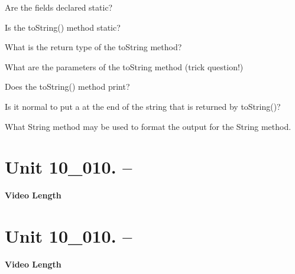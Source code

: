 \documentclass[letterpaper,12pt]{exam}
\newcommand{\unit}{Unit 10}
\begin{document}
\begin{questions}
\begin{samepage}
    \vspace{5mm}
\end{samepage}

\begin{samepage}
    \question Are the fields declared static?
    \vspace{5mm}
\end{samepage}

\begin{samepage}
    \question Is the toString() method static?
    \vspace{5mm}
\end{samepage}
\begin{samepage}
    \question What is the return type of the toString method?
    \vspace{5mm}
\end{samepage}
\begin{samepage}
    \question What are the parameters of the toString method (trick question!)
    \vspace{5mm}
\end{samepage}
\begin{samepage}
    \question Does the toString() method print?
    \vspace{5mm}
\end{samepage}
\begin{samepage}
    \question Is it normal to put a \n at the end of the string that is returned by toString()?
    \vspace{5mm}
\end{samepage}
\begin{samepage}
    \question What String method may be used to format the output for the String method.
    \vspace{5mm}
\end{samepage}


\section*{\unit\_010. -- } 
\par{\selectfont\textbf{Video Length }}

\section*{\unit\_010. -- } 
\par{\selectfont\textbf{Video Length }}


\end{questions}
\end{document}

